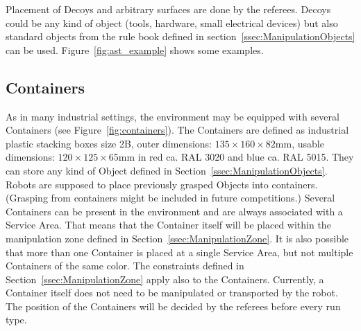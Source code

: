 Placement of Decoys and arbitrary surfaces are done by the referees. Decoys could be any kind of object (tools, hardware, small electrical devices) but also standard objects from the rule book defined in section~\ref{ssec:ManipulationObjects} can be used. Figure~\ref{fig:ast_example} shows some examples. 



\subsection{Containers}
\label{subsec:containers}
As in many industrial settings, the \RCAW environment may be equipped with several Containers (see Figure~\ref{fig:containers}). The Containers are defined as industrial plastic stacking boxes size 2B, outer dimensions: $135 \times 160 \times 82  \si{\milli\meter}$, usable dimensions: $120 \times 125 \times 65  \si{\milli\meter}$  in red ca. RAL 3020 and blue ca. RAL 5015.
They can store any kind of Object defined in Section~\ref{ssec:ManipulationObjects}. Robots are supposed to place previously grasped Objects into containers. 
(Grasping from containers might be included in future competitions.) Several Containers can be present in the environment and are always associated with a Service Area. That means that the Container itself will be placed within the manipulation zone defined in Section~\ref{ssec:ManipulationZone}.
It is also possible that more than one Container is placed at a single Service Area, but not multiple Containers of the same color.
The constraints defined in Section~\ref{ssec:ManipulationZone} apply also to the Containers.
Currently, a Container itself does not need to be manipulated or transported by the robot. The position of the Containers will be decided by the referees before every run type.

